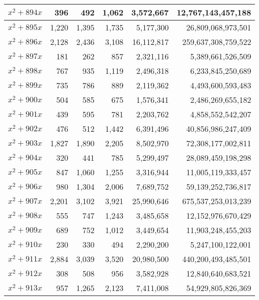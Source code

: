 \documentclass[a4paper]{amsproc}
\theoremstyle{plain}
\theoremstyle{named}
\begin{document}
\begin{longtable}{ | l | r | r | r | r | r | }
$x^2 + 894x$ & 396 & 492 & 1{,}062 & 3{,}572{,}667 & 12{,}767{,}143{,}457{,}188 \\ \hline
$x^2 + 895x$ & 1{,}220 & 1{,}395 & 1{,}735 & 5{,}177{,}300 & 26{,}809{,}068{,}973{,}501 \\ \hline
$x^2 + 896x$ & 2{,}128 & 2{,}436 & 3{,}108 & 16{,}112{,}817 & 259{,}637{,}308{,}759{,}522 \\ \hline
$x^2 + 897x$ & 181 & 262 & 857 & 2{,}321{,}116 & 5{,}389{,}661{,}526{,}509 \\ \hline
$x^2 + 898x$ & 767 & 935 & 1{,}119 & 2{,}496{,}318 & 6{,}233{,}845{,}250{,}689 \\ \hline
$x^2 + 899x$ & 735 & 786 & 889 & 2{,}119{,}362 & 4{,}493{,}600{,}593{,}483 \\ \hline
$x^2 + 900x$ & 504 & 585 & 675 & 1{,}576{,}341 & 2{,}486{,}269{,}655{,}182 \\ \hline
$x^2 + 901x$ & 439 & 595 & 781 & 2{,}203{,}762 & 4{,}858{,}552{,}542{,}207 \\ \hline
$x^2 + 902x$ & 476 & 512 & 1{,}442 & 6{,}391{,}496 & 40{,}856{,}986{,}247{,}409 \\ \hline
$x^2 + 903x$ & 1{,}827 & 1{,}890 & 2{,}205 & 8{,}502{,}970 & 72{,}308{,}177{,}002{,}811 \\ \hline
$x^2 + 904x$ & 320 & 441 & 785 & 5{,}299{,}497 & 28{,}089{,}459{,}198{,}298 \\ \hline
$x^2 + 905x$ & 847 & 1{,}060 & 1{,}255 & 3{,}316{,}944 & 11{,}005{,}119{,}333{,}457 \\ \hline
$x^2 + 906x$ & 980 & 1{,}304 & 2{,}006 & 7{,}689{,}752 & 59{,}139{,}252{,}736{,}817 \\ \hline
$x^2 + 907x$ & 2{,}201 & 3{,}102 & 3{,}921 & 25{,}990{,}646 & 675{,}537{,}253{,}013{,}239 \\ \hline
$x^2 + 908x$ & 555 & 747 & 1{,}243 & 3{,}485{,}658 & 12{,}152{,}976{,}670{,}429 \\ \hline
$x^2 + 909x$ & 689 & 752 & 1{,}012 & 3{,}449{,}654 & 11{,}903{,}248{,}455{,}203 \\ \hline
$x^2 + 910x$ & 230 & 330 & 494 & 2{,}290{,}200 & 5{,}247{,}100{,}122{,}001 \\ \hline
$x^2 + 911x$ & 2{,}884 & 3{,}039 & 3{,}520 & 20{,}980{,}500 & 440{,}200{,}493{,}485{,}501 \\ \hline
$x^2 + 912x$ & 308 & 508 & 956 & 3{,}582{,}928 & 12{,}840{,}640{,}683{,}521 \\ \hline
$x^2 + 913x$ & 957 & 1{,}265 & 2{,}123 & 7{,}411{,}008 & 54{,}929{,}805{,}826{,}369 \\ \hline

\end{longtable}
\end{document}
